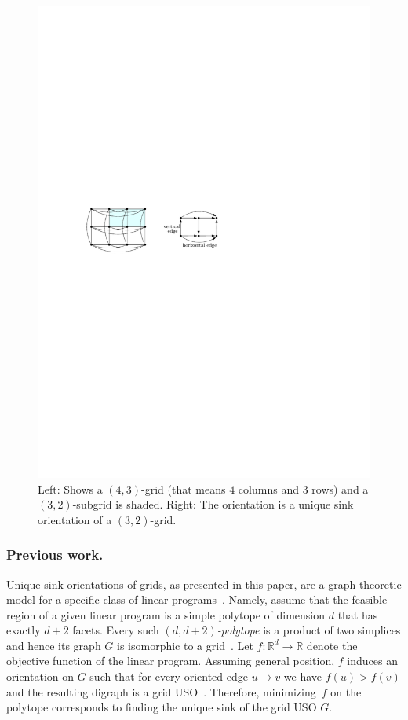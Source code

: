 \documentclass[runningheads,a4paper]{llncs}
\newcommand{\RR}{\ensuremath{\mathbb{R}}}
\begin{document}
  \begin{figure}[htbp] 
  	\centering
  	\includegraphics{uso_example.pdf}
  	\caption{\small Left: Shows a $(4,3)$-grid (that means $4$ columns and $3$ rows) 
  	and a $(3,2)$-subgrid is shaded. Right: The orientation is a unique sink orientation of a $(3,2)$-grid.} 
  	\label{fig:examplegrid}
  \end{figure}



\vspace{-.2in}\subsubsection{Previous work.}

Unique sink orientations of grids, as presented in this paper,
are a graph-theoretic model for a specific class of linear programs~\cite{linepoint}.
Namely, assume that the feasible region of a given linear program is a
simple polytope of dimension $d$ that has exactly $d+2$ facets.
Every such \emph{$(d, d+2)$-polytope} is a product of two simplices and hence its graph $G$ is isomorphic to a grid~\cite{grid05}. 
Let $f : \RR^d \to \RR$ denote the objective function of the linear program.
Assuming general position, $f$ induces an orientation on $G$ such that for every oriented
edge $u \to v$ we have $f(u) > f(v)$ and the resulting digraph is a grid USO~\cite{grid05}.
Therefore, minimizing~$f$ on the polytope corresponds to finding the
unique sink of the grid USO $G$.
\end{document}
